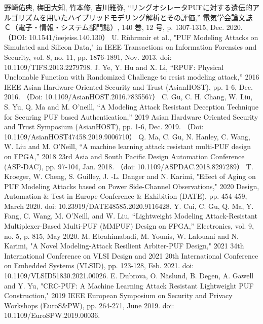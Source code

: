 \documentclass[technicalreport]{ieicej} %
\begin{document}
\begin{thebibliography}{99}
  野崎佑典, 梅田大知, 竹本修, 吉川雅弥,
  “リングオシレータPUFに対する遺伝的アルゴリズムを用いたハイブリッドモデリング解析とその評価,”
  電気学会論文誌Ｃ（電子・情報・システム部門誌）, 140 巻, 12 号, p. 1307-1315, Dec. 2020.
  （DOI: 10.1541/ieejeiss.140.130）
  U. Rührmair et al., "PUF Modeling Attacks on Simulated and Silicon Data,"
  in IEEE Transactions on Information Forensics and Security, vol. 8, no. 11, pp. 1876-1891, Nov. 2013.
  doi: 10.1109/TIFS.2013.2279798.
  J. Ye, Y. Hu and X. Li, “RPUF: Physical Unclonable Function with Randomized Challenge to resist modeling attack,”
  2016 IEEE Asian Hardware-Oriented Security and Trust (AsianHOST), pp. 1-6, Dec. 2016.
  （Doi: 10.1109/AsianHOST.2016.7835567）
  C. Gu, C. H. Chang, W. Liu, S. Yu, Q. Ma and M. O'neill,
  “A Modeling Attack Resistant Deception Technique for Securing PUF based Authentication,”
  2019 Asian Hardware Oriented Security and Trust Symposium (AsianHOST), pp. 1-6, Dec. 2019.
  （Doi: 10.1109/AsianHOST47458.2019.9006710）
  Q. Ma, C. Gu, N. Hanley, C. Wang, W. Liu and M. O'Neill, “A machine learning attack resistant multi-PUF design on FPGA,”
  2018 23rd Asia and South Pacific Design Automation Conference (ASP-DAC), pp. 97-104, Jan. 2018.
  （doi: 10.1109/ASPDAC.2018.8297289）
  T. Kroeger, W. Cheng, S. Guilley, J. -L. Danger and N. Karimi,
  "Effect of Aging on PUF Modeling Attacks based on Power Side-Channel Observations,"
  2020 Design, Automation \& Test in Europe Conference \& Exhibition (DATE), pp. 454-459, March 2020.
  doi: 10.23919/DATE48585.2020.9116428.
  Y. Cui, C. Gu, Q. Ma, Y. Fang, C. Wang, M. O’Neill, and W. Liu, “Lightweight Modeling Attack-Resistant Multiplexer-Based Multi-PUF (MMPUF) Design on FPGA,”
  Electronics, vol. 9, no. 5, p. 815, May 2020.
  M. Ebrahimabadi, M. Younis, W. Lalouani and N. Karimi, "A Novel Modeling-Attack Resilient Arbiter-PUF Design,"
  2021 34th International Conference on VLSI Design and 2021 20th International Conference on Embedded Systems (VLSID), pp. 123-128, Feb. 2021.
  doi: 10.1109/VLSID51830.2021.00026.
  E. Dubrova, O. Näslund, B. Degen, A. Gawell and Y. Yu, "CRC-PUF: A Machine Learning Attack Resistant Lightweight PUF Construction,"
  2019 IEEE European Symposium on Security and Privacy Workshops (EuroS\&PW), pp. 264-271, June 2019.
  doi: 10.1109/EuroSPW.2019.00036.

\end{thebibliography}
\end{document}
